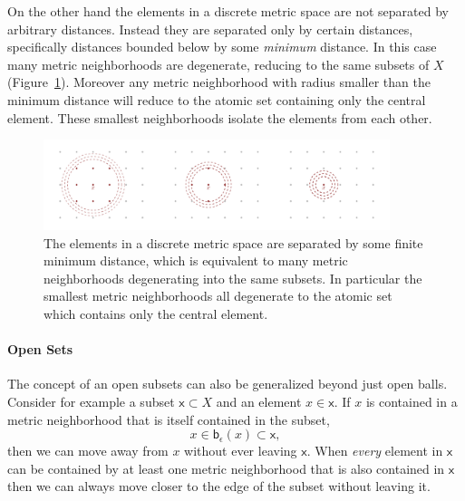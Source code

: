\documentclass[
  letterpaper,
  DIV=11,
  numbers=noendperiod]{scrartcl}
\let\oldparagraph\paragraph
\renewcommand{\paragraph}[1]{\oldparagraph{#1}\mbox{}}
\begin{document}
On the other hand the elements in a discrete metric space are not
separated by arbitrary distances. Instead they are separated only by
certain distances, specifically distances bounded below by some
\emph{minimum} distance. In this case many metric neighborhoods are
degenerate, reducing to the same subsets of \(X\)
(Figure~\ref{fig-metric-discrete-neighborhoods}). Moreover any metric
neighborhood with radius smaller than the minimum distance will reduce
to the atomic set containing only the central element. These smallest
neighborhoods isolate the elements from each other.

\begin{figure}

{\centering \includegraphics[width=0.9\textwidth,height=\textheight]{figures/structures/metric_topology/discrete_neighborhoods/discrete_neighborhoods.pdf}

}

\caption{\label{fig-metric-discrete-neighborhoods}The elements in a
discrete metric space are separated by some finite minimum distance,
which is equivalent to many metric neighborhoods degenerating into the
same subsets. In particular the smallest metric neighborhoods all
degenerate to the atomic set which contains only the central element.}

\end{figure}

\hypertarget{sec:open-sets}{%
\paragraph{Open Sets}\label{sec:open-sets}}

The concept of an open subsets can also be generalized beyond just open
balls. Consider for example a subset \(\mathsf{x} \subset X\) and an
element \(x \in \mathsf{x}\). If \(x\) is contained in a metric
neighborhood that is itself contained in the subset, \[
x \in \mathsf{b}_{\epsilon}(x) \subset \mathsf{x},
\] then we can move away from \(x\) without ever leaving \(\mathsf{x}\).
When \emph{every} element in \(\mathsf{x}\) can be contained by at least
one metric neighborhood that is also contained in \(\mathsf{x}\) then we
can always move closer to the edge of the subset without leaving it.
\end{document}
